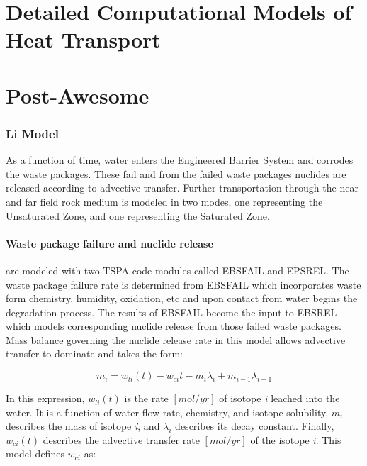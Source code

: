\section{Detailed Computational Models of Heat Transport}
\label{sec:detailed_heat}




\section{Post-Awesome}




\subsubsection{Li Model\cite{li_methodology_2006}}
As a function of time, water enters the Engineered Barrier System and 
corrodes the waste packages.  These fail and from the failed waste 
packages nuclides are released according to advective transfer.  
Further transportation through the near and far field rock medium is 
modeled in two modes, one representing the Unsaturated Zone, and one 
representing the Saturated Zone.

\paragraph{Waste package failure and nuclide release} are modeled with 
two TSPA code modules called EBSFAIL and EPSREL. The waste package 
failure rate is determined from EBSFAIL which incorporates waste form 
chemistry, humidity, oxidation, etc and upon contact from water begins 
the degradation process. The results of EBSFAIL become the input to 
EBSREL which models corresponding nuclide release from those failed 
waste packages. Mass balance governing the nuclide release rate in 
this model allows advective transfer to dominate and takes the form:

\begin{equation}
\dot{m_i}=w_{li}(t)-w_{ci}{t}-m_i\lambda_i+m_{i-1}\lambda_{i-1}\nonumber
\end{equation}

In this expression, $w_{li}(t)$ is the rate $[mol/yr]$ of isotope 
\emph{i} leached into the water.  It is a function of water flow rate, 
chemistry, and isotope solubility. $m_i$ describes the mass of isotope 
\emph{i}, and $\lambda_i$ describes its decay constant. Finally, 
$w_{ci}(t)$ describes the advective transfer rate $[mol/yr]$ of the 
isotope \emph{i}. This model defines $w_{ci}$ as:

